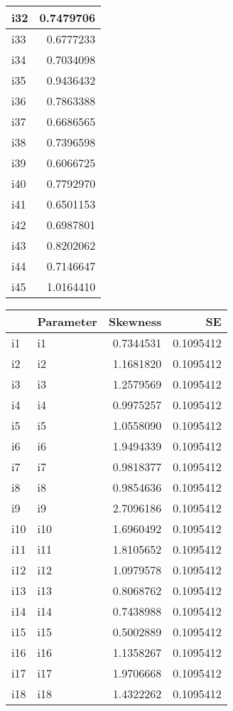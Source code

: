 \documentclass[
]{article}
\begin{document}
\begin{table}
\begin{tabular}[t]{l|r}
\hline
i32 & 0.7479706\\
\hline
i33 & 0.6777233\\
\hline
i34 & 0.7034098\\
\hline
i35 & 0.9436432\\
\hline
i36 & 0.7863388\\
\hline
i37 & 0.6686565\\
\hline
i38 & 0.7396598\\
\hline
i39 & 0.6066725\\
\hline
i40 & 0.7792970\\
\hline
i41 & 0.6501153\\
\hline
i42 & 0.6987801\\
\hline
i43 & 0.8202062\\
\hline
i44 & 0.7146647\\
\hline
i45 & 1.0164410\\
\hline
\end{tabular}
\centering
\begin{tabular}[t]{l|l|r|r}
\hline
  & Parameter & Skewness & SE\\
\hline
i1 & i1 & 0.7344531 & 0.1095412\\
\hline
i2 & i2 & 1.1681820 & 0.1095412\\
\hline
i3 & i3 & 1.2579569 & 0.1095412\\
\hline
i4 & i4 & 0.9975257 & 0.1095412\\
\hline
i5 & i5 & 1.0558090 & 0.1095412\\
\hline
i6 & i6 & 1.9494339 & 0.1095412\\
\hline
i7 & i7 & 0.9818377 & 0.1095412\\
\hline
i8 & i8 & 0.9854636 & 0.1095412\\
\hline
i9 & i9 & 2.7096186 & 0.1095412\\
\hline
i10 & i10 & 1.6960492 & 0.1095412\\
\hline
i11 & i11 & 1.8105652 & 0.1095412\\
\hline
i12 & i12 & 1.0979578 & 0.1095412\\
\hline
i13 & i13 & 0.8068762 & 0.1095412\\
\hline
i14 & i14 & 0.7438988 & 0.1095412\\
\hline
i15 & i15 & 0.5002889 & 0.1095412\\
\hline
i16 & i16 & 1.1358267 & 0.1095412\\
\hline
i17 & i17 & 1.9706668 & 0.1095412\\
\hline
i18 & i18 & 1.4322262 & 0.1095412\\

\end{tabular}
\end{table}
\end{document}

